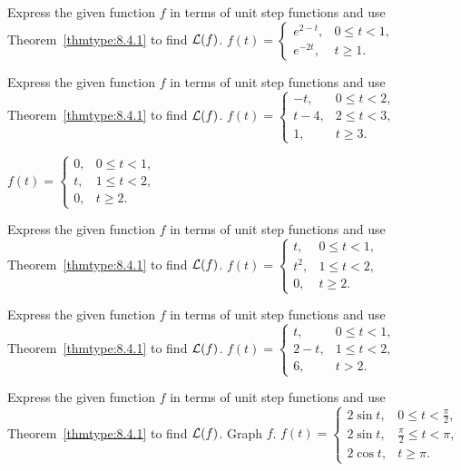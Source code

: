 \documentclass{ximera}
\begin{document}
\begin{problem}\label{exer:8.4.10} 
Express the
given function $f$ in terms of unit step functions
 and use Theorem~\ref{thmtype:8.4.1} to find ${\cal L}(f)$.
$f(t)=\left\{\begin{array}{cl}
e^{2-t}, &0\le t<1,\\ 
e^{-2t},&t\ge1.\end{array}\right.$
\end{problem}

\begin{problem}\label{exer:8.4.11}
Express the
given function $f$ in terms of unit step functions
 and use Theorem~\ref{thmtype:8.4.1} to find ${\cal L}(f)$. 
$f(t)=\left\{\begin{array}{cl} -t,&0 \le
t<2,\\ t-4,&2\le t<3,\\ 1,&t\ge3.
\end{array}\right.$
\end{problem}

\begin{problem}\label{exer:8.4.12} $f(t)=\left\{\begin{array}{cl} 0,&0 \le
t<1,\\ t,&1\le t<2,\\ 0,&t\ge2.\end{array}\right.$
\end{problem}

\begin{problem}\label{exer:8.4.13} 
 Express the
given function $f$ in terms of unit step functions
 and use Theorem~\ref{thmtype:8.4.1} to find ${\cal L}(f)$.
 $f(t)=\left\{\begin{array}{cl} t,&0 \le
t<1,\\ t^2,&1\le t<2,\\ 0,&t\ge2. \end{array}\right.$
\end{problem}

 \begin{problem}\label{exer:8.4.14} 
 Express the
given function $f$ in terms of unit step functions
 and use Theorem~\ref{thmtype:8.4.1} to find ${\cal L}(f)$.
 $f(t)=\left\{\begin{array}{cl} t,&0\le
t<1,\\ 2-t,&1\le t<2,\\ 6,&t > 2. \end{array}\right.$
\end{problem}

\begin{problem}\label{exer:8.4.15} 
Express the given function $f$ in terms of unit step functions and use Theorem~\ref{thmtype:8.4.1} to find ${\cal L}(f)$.  Graph $f$.
 $f(t)=\left\{\begin{array}{cl}
2
\sin t,&0\le t<\frac{\pi}{2},\\ 2\sin t,&
\frac{\pi}{2}\le t<\pi,\\ 2\cos t,
&t\ge\pi.\end{array}\right.$
\end{problem}
\end{document}

